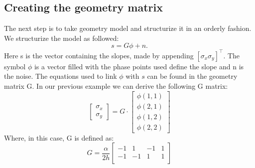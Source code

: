 \documentclass{article}
\begin{document}
\subsection{Creating the geometry matrix}
The next step is to take geometry model and structurize it in an orderly fashion. We structurize the model as followed:
$$ s = G\phi + n.$$  
Here s is the vector containing the slopes, made by appending $[\sigma_x \sigma_y]^\top$. The symbol $\phi$ is a vector filled with the phase points used define the slope and n is the noise. The equations used to link $\phi$ with $s$ can be found in the geometry matrix G. In our previous example we can derive the following G matrix:
$$ 
\begin{bmatrix}
\sigma_x \\
\sigma_y
\end{bmatrix} 
=
G
\cdot
\begin{bmatrix}
\phi(1,1) \\
\phi(2,1) \\
\phi(1,2) \\
\phi(2,2) 
\end{bmatrix}
$$
Where, in this case, G is defined as:
$$
G
=
\frac{\alpha}{2h}
\begin{bmatrix}
-1 & 1 & -1 & 1 \\
-1 & -1 & 1 & 1 \\
\end{bmatrix}
$$
\end{document}
